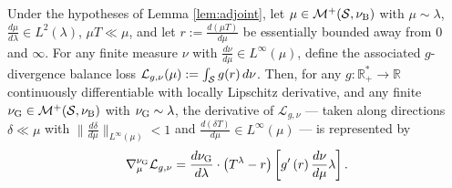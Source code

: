 \begin{theorem}\label{theo:first_variation_full}
 Under the hypotheses of Lemma \ref{lem:adjoint}, let $\mu\in \mathcal M^+(\mathcal S,\nu_{\mathrm{B}})$ with $\mu\sim\lambda$, $\frac{d\mu}{d\lambda}\in L^2(\lambda)$, $\mu T\ll\mu$, and let $r:=\frac{d(\mu T)}{d\mu}$ be essentially bounded away from $0$ and $\infty$. For any finite measure $\nu$ with $\frac{d\nu}{d\mu}\in L^\infty(\mu)$, define the associated $g$-divergence balance loss $\mathcal L_{g,\nu}(\mu) := \int_{\mathcal S} g(r)\, d\nu$. Then, for any $g:\mathbb R_+^*\rightarrow \mathbb R$ continuously differentiable with locally Lipschitz derivative, and any finite $\nu_{\mathrm{G}}\in \mathcal M^+(\mathcal S,\nu_{\mathrm{B}})$ with $\nu_{\mathrm{G}}\sim\lambda$, the derivative of $\mathcal L_{g,\nu}$ --- taken along directions $\delta\ll\mu$ with $\|\frac{d\delta}{d\mu}\|_{L^\infty(\mu)}<1$ and $\frac{d(\delta T)}{d\mu}\in L^\infty(\mu)$ --- is represented by
 \begin{equation}
      \nabla_{\mu}^{\nu_{\mathrm{G}}} \mathcal L_{g,\nu} = \frac{d\nu_{\mathrm{G}}}{d\lambda}\cdot\left(T^\lambda-r\right)\left[g'\left(r\right)\frac{d\nu}{d\mu}\lambda \right].
     \end{equation}

\end{theorem}

